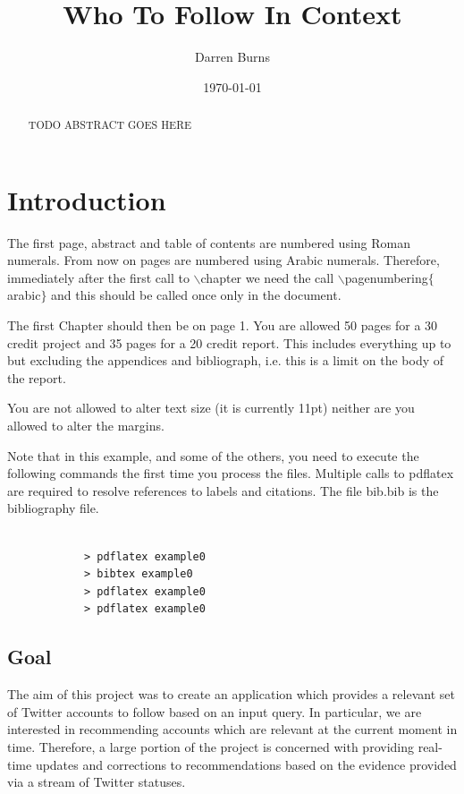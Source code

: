 \documentclass{l4proj}
\begin{document}
\title{Who To Follow In Context}
\author{Darren Burns}
\date{\today}
\maketitle

\begin{abstract}
TODO ABSTRACT GOES HERE
\end{abstract}

\educationalconsent
%
%
\tableofcontents

\chapter{Introduction}
The first page, abstract and table of contents are numbered using Roman numerals. From now on pages are numbered
using Arabic numerals. Therefore, immediately after the first call to $\backslash$chapter we need the call
$\backslash$pagenumbering$\{$arabic$\}$ and this should be called once only in the document. 

The first Chapter should then be on page 1. You are allowed 50 pages for a 30 credit project and 35 pages for a 
20 credit report. This includes everything up to but excluding the appendices and bibliograph, i.e. this is a limit on
the body of the report.

You are not allowed to alter text size (it is currently 11pt) neither are you allowed to alter the margins.

Note that in this example, and some of the others, you need to execute the following commands the first time you process the files.
Multiple calls to pdflatex are required to resolve references to labels and citations. The file bib.bib is the bibliography file.

\begin{verbatim}

            > pdflatex example0
            > bibtex example0
            > pdflatex example0
            > pdflatex example0

\end{verbatim}


\section{Goal}
The aim of this project was to create an application which provides a relevant set of Twitter accounts to follow based on an input query. In particular, we are interested in recommending accounts which are relevant at the current moment in time. Therefore, a large portion of the project is concerned with providing real-time updates and corrections to recommendations based on the evidence provided via a stream of Twitter statuses.
\end{document}
